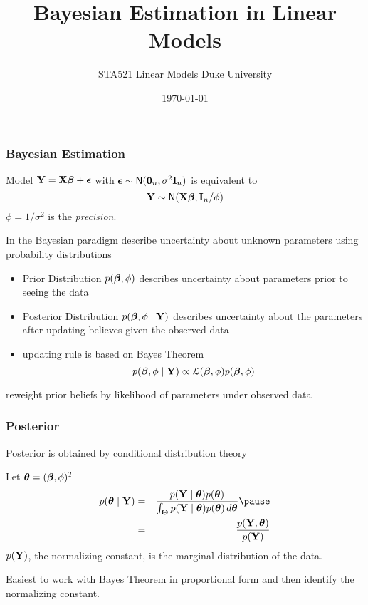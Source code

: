 \documentclass[handout]{beamer}\usepackage[]{graphicx}\usepackage[]{color}
\title{Bayesian Estimation in Linear Models}
\institute{Merlise Clyde}
\author{STA521 Linear Models Duke University}
\date{\today}
\begin{document}
\maketitle

\begin{frame}
  \frametitle{Bayesian Estimation}
  Model $\mathbf{Y} = \mathbf{X} \boldsymbol{\beta} + \boldsymbol{\epsilon}$  with $\boldsymbol{\epsilon} \sim \textsf{N}(\mathbf{0}_n , \sigma^2
  \mathbf{I}_n)$ \pause
is equivalent to
$$
\mathbf{Y} \sim \textsf{N}(\mathbf{X} \boldsymbol{\beta}, \mathbf{I}_n/\phi)
$$
\pause
 $\phi = 1/\sigma^2$ is the {\it precision}.
\pause

\vspace{14pt}
In the  Bayesian paradigm describe uncertainty about unknown
parameters using probability distributions
\pause
\begin{itemize}
\item  Prior Distribution $p(\boldsymbol{\beta}, \phi)$ describes uncertainty about
  parameters prior to seeing the data \pause
\item Posterior Distribution $p(\boldsymbol{\beta}, \phi \mid \mathbf{Y})$ describes
  uncertainty about the parameters after updating  believes given the
  observed data \pause
\item updating rule is based on Bayes Theorem
$$p(\boldsymbol{\beta}, \phi \mid \mathbf{Y}) \propto {\cal{L}}(\boldsymbol{\beta}, \phi) p(\boldsymbol{\beta}, \phi)$$
\pause
\end{itemize}
 reweight prior beliefs by likelihood of parameters  under observed data
\end{frame}

\begin{frame}
  \frametitle{Posterior}
  Posterior is obtained by conditional distribution theory \pause

  Let $\boldsymbol{\theta} = (\boldsymbol{\beta}, \phi)^T$ \pause
\begin{eqnarray*}
  p(\t \mid \Y ) & = & \frac{p(\Y \mid \t) p(\t) }
{ \int_{\T} p(\Y \mid \t)   p(\t) \, d\t} \pause \\
& = &  \frac{p(\Y, \t)}{p(\Y)}
\end{eqnarray*}
\pause
$p(\mathbf{Y})$, the normalizing constant, is the marginal distribution of the data.
\pause
\vfill

Easiest to work with Bayes Theorem in proportional form and then
identify the normalizing constant.
\end{frame}
\end{document}
